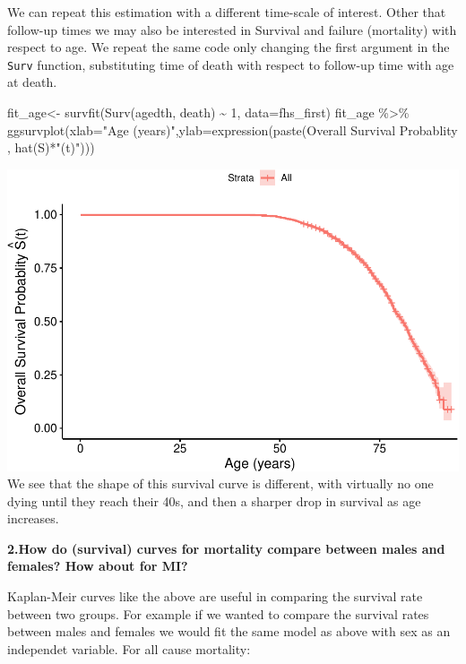 \documentclass[
]{book}
\newenvironment{Shaded}{\begin{snugshade}}{\end{snugshade}}
\newcommand{\AttributeTok}[1]{\textcolor[rgb]{0.77,0.63,0.00}{#1}}
\newcommand{\DecValTok}[1]{\textcolor[rgb]{0.00,0.00,0.81}{#1}}
\newcommand{\FunctionTok}[1]{\textcolor[rgb]{0.00,0.00,0.00}{#1}}
\newcommand{\NormalTok}[1]{#1}
\newcommand{\OtherTok}[1]{\textcolor[rgb]{0.56,0.35,0.01}{#1}}
\newcommand{\SpecialCharTok}[1]{\textcolor[rgb]{0.00,0.00,0.00}{#1}}
\newcommand{\StringTok}[1]{\textcolor[rgb]{0.31,0.60,0.02}{#1}}
\begin{document}
We can repeat this estimation with a different time-scale of interest. Other that follow-up times we may also be interested in Survival and failure (mortality) with respect to age. We repeat the same code only changing the first argument in the \texttt{Surv} function, substituting time of death with respect to follow-up time with age at death.

\begin{Shaded}
\begin{Highlighting}[]
\NormalTok{fit\_age}\OtherTok{\textless{}{-}} \FunctionTok{survfit}\NormalTok{(}\FunctionTok{Surv}\NormalTok{(agedth, death) }\SpecialCharTok{\textasciitilde{}} \DecValTok{1}\NormalTok{, }\AttributeTok{data=}\NormalTok{fhs\_first)}
\NormalTok{fit\_age }\SpecialCharTok{\%\textgreater{}\%}
\FunctionTok{ggsurvplot}\NormalTok{(}\AttributeTok{xlab=}\StringTok{"Age (years)"}\NormalTok{,}\AttributeTok{ylab=}\FunctionTok{expression}\NormalTok{(}\FunctionTok{paste}\NormalTok{(}\StringTok{\textquotesingle{}Overall Survival Probablity \textquotesingle{}}\NormalTok{, }\FunctionTok{hat}\NormalTok{(S)}\SpecialCharTok{*}\StringTok{"(t)"}\NormalTok{)))}
\end{Highlighting}
\end{Shaded}

\includegraphics{adv_epi_analysis_files/figure-latex/unnamed-chunk-195-1.pdf}
We see that the shape of this survival curve is different, with virtually no one dying until they reach their 40s, and then a sharper drop in survival as age increases.

\textbf{2.How do (survival) curves for mortality compare between males and females? How about for MI?}

Kaplan-Meir curves like the above are useful in comparing the survival rate between two groups. For example if we wanted to compare the survival rates between males and females we would fit the same model as above with sex as an independet variable. For all cause mortality:
\end{document}
